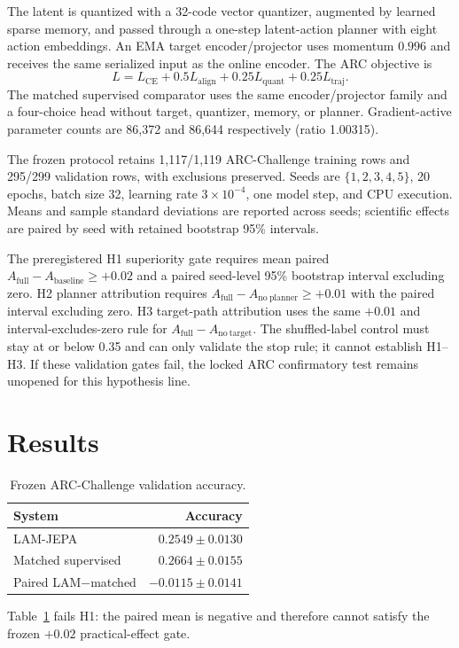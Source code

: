 \documentclass[10pt,conference]{IEEEtran}
\begin{document}
The latent is quantized with a 32-code vector quantizer, augmented by learned sparse memory, and passed through a one-step latent-action planner with eight action embeddings. An EMA target encoder/projector uses momentum $0.996$ and receives the same serialized input as the online encoder. The ARC objective is
\begin{equation}
L=L_{\mathrm{CE}}+0.5L_{\mathrm{align}}+0.25L_{\mathrm{quant}}+0.25L_{\mathrm{traj}}.
\end{equation}
The matched supervised comparator uses the same encoder/projector family and a four-choice head without target, quantizer, memory, or planner. Gradient-active parameter counts are 86,372 and 86,644 respectively (ratio 1.00315).

The frozen protocol retains 1,117/1,119 ARC-Challenge training rows and 295/299 validation rows, with exclusions preserved. Seeds are $\{1,2,3,4,5\}$, 20 epochs, batch size 32, learning rate $3\times10^{-4}$, one model step, and CPU execution. Means and sample standard deviations are reported across seeds; scientific effects are paired by seed with retained bootstrap 95\% intervals.

The preregistered H1 superiority gate requires mean paired $A_{\mathrm{full}}-A_{\mathrm{baseline}}\ge +0.02$ and a paired seed-level 95\% bootstrap interval excluding zero. H2 planner attribution requires $A_{\mathrm{full}}-A_{\mathrm{no\ planner}}\ge +0.01$ with the paired interval excluding zero. H3 target-path attribution uses the same $+0.01$ and interval-excludes-zero rule for $A_{\mathrm{full}}-A_{\mathrm{no\ target}}$. The shuffled-label control must stay at or below 0.35 and can only validate the stop rule; it cannot establish H1--H3. If these validation gates fail, the locked ARC confirmatory test remains unopened for this hypothesis line.

\section{Results}
\begin{table}[t]
\centering
\caption{Frozen ARC-Challenge validation accuracy.}
\label{tab:main}
\begin{tabular}{lr}
\toprule
System & Accuracy \\
\midrule
LAM-JEPA & $0.2549\pm0.0130$ \\
Matched supervised & $0.2664\pm0.0155$ \\
Paired LAM$-$matched & $-0.0115\pm0.0141$ \\
\bottomrule
\end{tabular}
\end{table}
Table~\ref{tab:main} fails H1: the paired mean is negative and therefore cannot satisfy the frozen $+0.02$ practical-effect gate.
\end{document}
